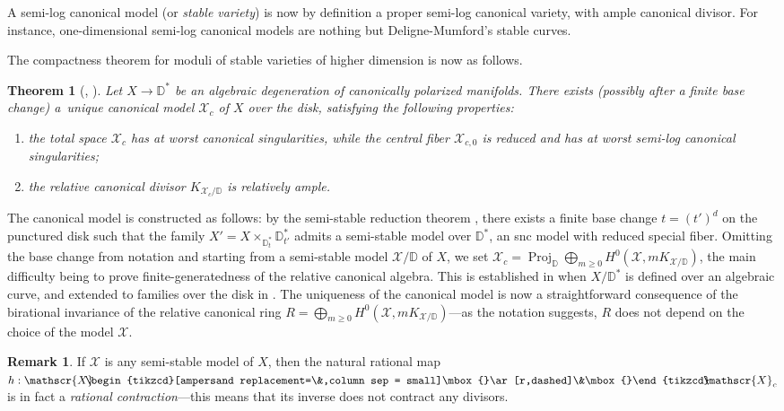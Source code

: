 \documentclass[JEP,XML,SOM,Unicode,published]{cedram}
\newenvironment{enumeratei}
{\bgroup\def\theenumi{\roman{enumi}}\def\theenumii{\arabic{enumii}}\begin{enumerate}}
{\end{enumerate}\egroup}
\newcommand{\dradpl}{{\hspace*{-2.5mm}\begin{tikzcd}[ampersand replacement=\&,column sep = scriptsize]\mbox{}\ar[r,dashed]\&\mbox{}\end{tikzcd}\hspace*{-2.5mm}}}
\newcommand{\dratst}{{\hspace*{-2.5mm}\begin{tikzcd}[ampersand replacement=\&,column sep = small]\mbox{}\ar[r,dashed]\&\mbox{}\end{tikzcd}\hspace*{-2mm}}}
\let\drascst\dratst
\newcommand{\dra}{\mathchoice{\dradpl}{\dratst}{\drascst}{\drascst}}
\newtheorem{theo}[equation]{Theorem}
\theoremstyle{definition}
\newtheorem{rem}[equation]{Remark}
\newcommand \D {\mathbb{D}}
\newcommand \X {\mathscr{X}}
\DeclareMathOperator{\Proj}{Proj}
\begin{document}
A semi-log canonical model (or \emph{stable variety}) is now by definition a proper semi-log canonical variety, with ample canonical divisor. For instance, one-dimensional semi-log canonical models are nothing but Deligne-Mumford's stable curves.

The compactness theorem for moduli of stable varieties of higher dimension is now as follows.
\begin{theo}[{\cite{BCHM}, \cite{KNX}}]
Let $X \to \D^*$ be an algebraic degeneration of canonically polarized manifolds.
There exists (possibly after a finite base change) a~unique \emph{canonical} model $\X_c$ of $X$ over the disk, satisfying the following properties:
\begin{enumeratei}
\item
the total space $\X_c$ has at worst canonical singularities, while the central fiber $\X_{c,0}$ is reduced and has at worst semi-log canonical singularities;

\item
the relative canonical divisor $K_{\X_c/ \D}$ is relatively ample.
\end{enumeratei}
\end{theo}
The canonical model is constructed as follows: by the semi-stable reduction theorem \cite{KK}, there exists a finite base change $t = (t')^d$ on the punctured disk such that the family $X' = X \times_{\D^*_t} \D^*_{t'}$ admits a semi-stable model over $\D^*$, \ie an snc model with reduced special fiber. Omitting the base change from notation and starting from a semi-stable model $\X / \D$ of $X$, we set $\X_c = \Proj_{\D} \bigoplus_{m \ge 0} H^0 (\X, mK_{\X/ \D})$, the main difficulty being to prove finite-generatedness of the relative canonical algebra. This is established in \cite{BCHM} when $X / \D^*$ is defined over an algebraic curve, and extended to families over the disk in \cite{KNX}. The uniqueness of the canonical model is now a straightforward consequence of the birational invariance of the relative canonical ring $R=\bigoplus_{m \ge 0} H^0 (\X, mK_{\X/ \D})$---as the notation suggests, $R$ does not depend on the choice of the model $\X$.
\begin{rem}
If $\X$ is any semi-stable model of $X$, then the natural rational map $h: \X \dra \X_c$ is in fact a \emph{rational contraction}---this means that its inverse does not contract any divisors.
\end{rem}
\end{document}
